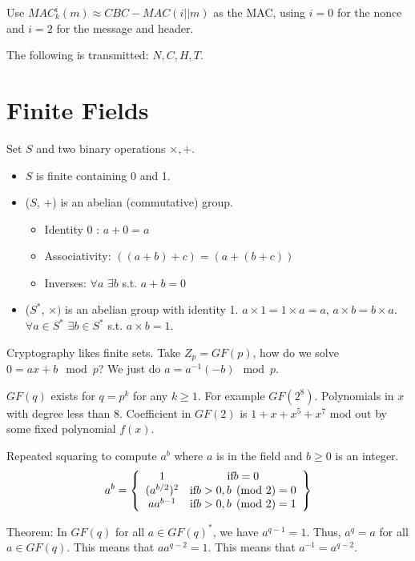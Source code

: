 \documentclass[psamsfonts]{amsart}
\begin{document}
Use $MAC_{k}^i (m) \approx CBC-MAC(i || m)$ as the MAC, using $i=0$ for the nonce and $i =2$ for the message and header.

The following is transmitted: $N, C, H, T$.

\section{Finite Fields}

Set $S$ and two binary operations $\times, +$.
\begin{itemize}
  \item $S$ is finite containing 0 and 1.
  \item ($S$, +) is an abelian (commutative) group.
    \begin{itemize}
      \item Identity 0 : $a + 0 = a$
      \item Associativity: $((a+b) + c ) = (a + (b+ c))$
      \item Inverses: $\forall a$ $\exists b$ s.t. $a + b = 0$
    \end{itemize}
  \item ($S^*$, $\times)$ is an abelian group with identity 1. $a \times 1 = 1 \times a = a$, $a \times b = b \times a$. $\forall a \in S^*$ $\exists b \in S^{*}$ s.t. $ a \times b = 1$.
\end{itemize}

Cryptography likes finite sets. Take $Z_p = GF(p)$, how do we solve $0 = ax + b \mod p$? We just do $a = a^{-1} (-b) \mod p$.

$GF(q)$ exists for $q = p^k$ for any $k \geq 1$. For example $GF(2^8)$. Polynomials in $x$ with degree less than $8$. Coefficient in $GF(2)$ is $1 + x + x^5 + x^7$ mod out by some fixed polynomial $f(x)$. 

Repeated squaring to compute $a^b$ where $a$ is in the field and $b \geq 0$ is an integer.
\begin{eqnarray}
  a^b = \left\{ \begin{array}{c c}
    1 & \text{if} b = 0 \\
      (a^{b/2})^2 & \text{if} b > 0, b \pmod{2} = 0 \\
        a a^{b-1} & \text{if} b > 0, b \pmod{2} = 1
  \end{array}\right\}
\end{eqnarray}

Theorem: In $GF(q)$ for all $a \in GF(q)^{*}$, we have $a^{q-1} = 1$. Thus, $a^{q} = a$ for all $a \in GF(q)$. This means that $a a^{q-2} = 1$. This means that $a^{-1} = a^{q-2}$. 
\end{document}
